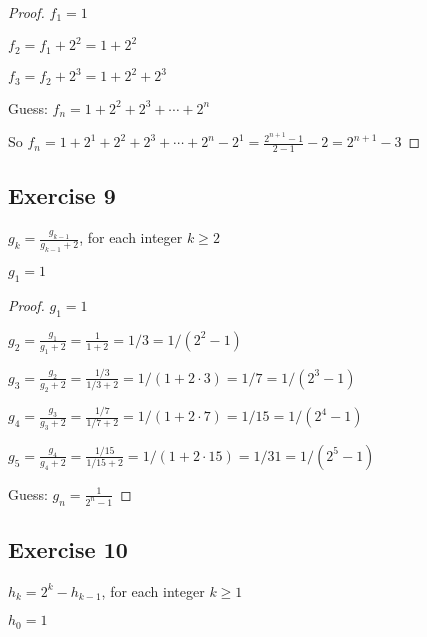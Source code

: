 \documentclass[14pt]{extarticle}
\newcommand{\dps}{\displaystyle}
\begin{document}
    \begin{proof}
        \(f_1 = 1\)

        \(f_2 = f_1 + 2^2 = 1 + 2^2\)

        \(f_3 = f_2 + 2^3 = 1 + 2^2 + 2^3\)

        Guess: \(f_n = 1 + 2^2 + 2^3 + \cdots + 2^n\)

        So \(f_n = 1 + 2^1 + 2^2 + 2^3 + \cdots + 2^n - 2^1 = \dps\frac{2^{n+1}-1}{2-1} - 2 = 2^{n+1} - 3\)
    \end{proof}

    \subsection{Exercise 9}
    \(g_k = \dps \frac{g_{k-1}}{g_{k-1} + 2}\), for each integer \(k \geq 2\)

    \(g_1 = 1\)

    \begin{proof}
        \(g_1 = 1\)

        \(g_2 = \dps \frac{g_1}{g_1 + 2} = \frac{1}{1 + 2} = 1/3 = 1/(2^2 - 1)\)

        \(g_3 = \dps \frac{g_2}{g_2 + 2} = \frac{1/3}{1/3 + 2} = 1/(1 + 2 \cdot 3) = 1 / 7 = 1 / (2^3 - 1)\)

        \(g_4 = \dps \frac{g_3}{g_3 + 2} = \frac{1/7}{1/7 + 2} = 1/(1 + 2 \cdot 7) = 1/15 = 1 / (2^4 - 1)\)

        \(g_5 = \dps \frac{g_4}{g_4 + 2} = \frac{1/15}{1/15 + 2} = 1/(1 + 2 \cdot 15) = 1/31 = 1 / (2^5 - 1)\)

        Guess: \(\dps g_n = \frac{1}{2^n - 1}\)
    \end{proof}

    \subsection{Exercise 10}
    \(h_k = 2^k - h_{k-1}\), for each integer \(k \geq 1\)

    \(h_0 = 1\)
\end{document}
